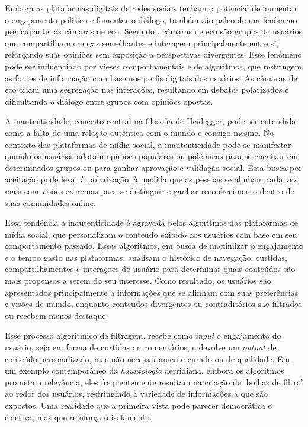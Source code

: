 Embora as plataformas digitais de redes sociais tenham o potencial de aumentar o engajamento político e fomentar o diálogo, também são palco de um fenômeno preocupante: as câmaras de eco. Segundo , câmaras de eco são grupos de usuários que compartilham crenças semelhantes e interagem principalmente entre si, reforçando suas opiniões sem exposição a perspectivas divergentes. Esse fenômeno pode ser influenciado por vieses comportamentais e de algoritmos, que restringem as fontes de informação com base nos perfis digitais dos usuários. As câmaras de eco criam uma segregação nas interações, resultando em debates polarizados e dificultando o diálogo entre grupos com opiniões opostas.

A inautenticidade, conceito central na filosofia de Heidegger, pode ser entendida como a falta de uma relação autêntica com o mundo e consigo mesmo. No contexto das plataformas de mídia social, a inautenticidade pode se manifestar quando os usuários adotam opiniões populares ou polêmicas para se encaixar em determinados grupos ou para ganhar aprovação e validação social. Essa busca por aceitação pode levar à polarização, à medida que as pessoas se alinham cada vez mais com visões extremas para se distinguir e ganhar reconhecimento dentro de suas comunidades online.

Essa tendência à inautenticidade é agravada pelos algoritmos das plataformas de mídia social, que personalizam o conteúdo exibido aos usuários com base em seu comportamento passado. Esses algoritmos, em busca de maximizar o engajamento e o tempo gasto nas plataformas, analisam o histórico de navegação, curtidas, compartilhamentos e interações do usuário para determinar quais conteúdos são mais propensos a serem do seu interesse. Como resultado, os usuários são apresentados principalmente a informações que se alinham com suas preferências e visões de mundo, enquanto conteúdos divergentes ou contraditórios são filtrados ou recebem menos destaque.

Esse processo algorítmico de filtragem, recebe como \textit{input} o engajamento do usuário, seja em forma de curtidas ou comentários, e devolve um \textit{output} de conteúdo personalizado, mas não necessariamente curado ou de qualidade. Em um exemplo contemporâneo da \textit{hauntologia} derridiana, embora os algoritmos prometam relevância, eles frequentemente resultam na criação de 'bolhas de filtro' ao redor dos usuários, restringindo a variedade de informações a que são expostos. Uma realidade que a primeira vista pode parecer democrática e coletiva, mas que reinforça o isolamento.

